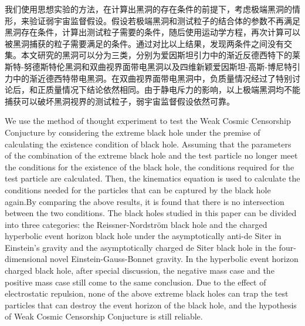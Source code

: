 \begin{cabstract}
    我们使用思想实验的方法，在计算出黑洞的存在条件的前提下，考虑极端黑洞的情形，来验证弱宇宙监督假设。假设若极端黑洞和测试粒子的结合体的参数不再满足黑洞存在条件，计算出测试粒子需要的条件，随后使用运动学方程，再次计算可以被黑洞捕获的粒子需要满足的条件。通过对比以上结果，发现两条件之间没有交集。本文研究的黑洞可以分为三类，分别为爱因斯坦引力中的渐近反德西特下的莱斯特-努德斯特伦黑洞和双曲视界面带电黑洞以及四维新颖爱因斯坦-高斯-博尼特引力中的渐近德西特带电黑洞。在双曲视界面带电黑洞中，负质量情况经过了特别讨论后，和正质量情况下结论依然相同。由于静电斥力的影响，以上极端黑洞均不能捕获可以破坏黑洞视界的测试粒子，弱宇宙监督假设依然可靠。
\end{cabstract}

\begin{eabstract}
    We use the method of thought experiment to test the Weak Cosmic Censorship Conjucture by considering the extreme black hole under the premise of calculating the existence condition of black hole. Assuming that the parameters of the combination of the extreme black hole and the test particle no longer meet the conditions for the existence of the black hole, the conditions required for the test particle are calculated. Then, the kinematics equation is used to calculate the conditions needed for the particles that can be captured by the black hole again.By comparing the above results, it is found that there is no intersection between the two conditions. The black holes studied in this paper can be divided into three categories: the Reissner-Nordström black hole and the charged hyperbolic event horizon black hole under the asymptotically anti-de Siter in Einstein's gravity and the asymptotically charged de Siter black hole in the four-dimensional novel Einstein-Gauss-Bonnet gravity. In the hyperbolic event horizon charged black hole, after special discussion, the negative mass case and the positive mass case still come to the same conclusion. Due to the effect of electrostatic repulsion, none of the above extreme black holes can trap the test particles that can destroy the event horizon of the black hole, and the hypothesis of Weak Cosmic Censorship Conjucture is still reliable.

\end{eabstract}

\makecover
\tableofcontents
